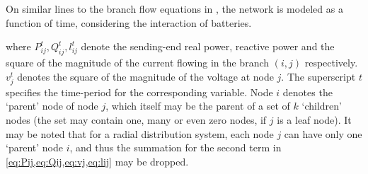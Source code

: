 \documentclass{article}
\begin{document}


On similar lines to the branch flow equations in \cite{bfm01}, the network is modeled as a function of time, considering the interaction of batteries.



where $P^{t}_{ij}, Q^{t}_{ij}, l^{t}_{ij}$ denote the sending-end real power, reactive power and the square of the magnitude of the current flowing in the branch $(i, j)$ respectively. $v^{t}_{j}$ denotes the square of the magnitude of the voltage at node $j$. The superscript $t$ specifies the time-period for the corresponding variable. Node $i$ denotes the `parent' node of node $j$, which itself may be the parent of a set of $k$ `children' nodes (the set may contain one, many or even zero nodes, if $j$ is a leaf node). It may be noted that for a radial distribution system, each node $j$ can have only one `parent' node $i$, and thus the summation for the second term in  \cref{eq:Pij,eq:Qij,eq:vj,eq:lij} may be dropped.
\end{document}
